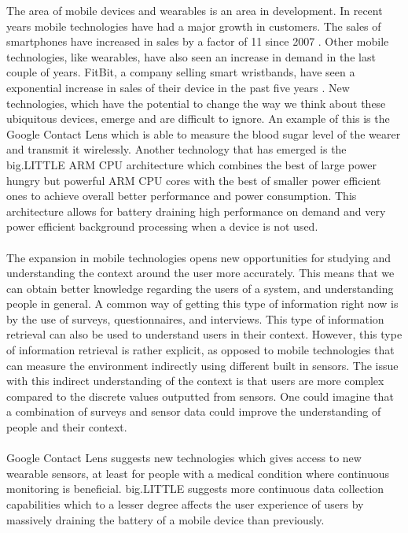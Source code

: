 The area of mobile devices and wearables is an area in development. In recent years mobile technologies have had a major growth in customers. The sales of smartphones have increased in sales by a factor of 11 since 2007 \parencite{statsia_smartphones}. Other mobile technologies, like wearables, have also seen an increase in demand in the last couple of years. FitBit, a company selling smart wristbands, have seen a exponential increase in sales of their device in the past five years \parencite{statsia_fitbit}. New technologies, which have the potential to change the way we think about these ubiquitous devices, emerge and are difficult to ignore. An example of this is the Google Contact Lens \parencite{google_contact_lens} which is able to measure the blood sugar level of the wearer and transmit it wirelessly. Another technology that has emerged is the big.LITTLE ARM CPU architecture \parencite{big_little_architecture} which combines the best of large power hungry but powerful ARM CPU cores with the best of smaller power efficient ones to achieve overall better performance and power consumption. This architecture allows for battery draining high performance on demand and very power efficient background processing when a device is not used. 
\\\\
The expansion in mobile technologies opens new opportunities for studying and understanding the context around the user more accurately. This means that we can obtain better knowledge regarding the users of a system, and understanding people in general. A common way of getting this type of information right now is by the use of surveys, questionnaires, and interviews. This type of information retrieval can also be used to understand users in their context. However, this type of information retrieval is rather explicit, as opposed to mobile technologies that can measure the environment indirectly using different built in sensors. The issue with this indirect understanding of the context is that users are more complex compared to the discrete values outputted from sensors. One could imagine that a combination of surveys and sensor data could improve the understanding of people and their context. 
\\\\
Google Contact Lens suggests new technologies which gives access to new wearable sensors, at least for people with a medical condition where continuous monitoring is beneficial. big.LITTLE suggests more continuous data collection capabilities which to a lesser degree affects the user experience of users by massively draining the battery of a mobile device than previously. 
